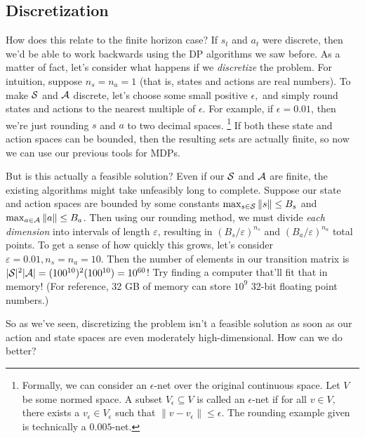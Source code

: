 \documentclass[../main/main]{subfiles}
\begin{document}

\subsection{Discretization}

How does this relate to the finite horizon case?
If $s_t$ and $a_t$ were discrete, then we'd be able to work backwards using
the DP algorithms we saw before.
As a matter of fact, let's consider what happens if we \emph{discretize} the
problem. For intuition, suppose $n_s = n_a = 1$ (that is, states and actions are real numbers).
To make $\S$ and $\A$ discrete, let's choose some small positive $\epsilon,$
and simply round states and actions to the nearest multiple of
$\epsilon.$ For example, if $\epsilon = 0.01$, then we're just rounding $s$ and $a$ to two decimal spaces. \footnote{Formally, we can consider an $\epsilon$-net over the original continuous space. Let $V$ be some normed space. A subset $V_\epsilon \subseteq V$ is called an $\epsilon$-net if for all $v \in V,$ there exists a $v_\epsilon \in V_\epsilon$ such that $\|v - v_\epsilon\| \le \epsilon.$ The rounding example given is technically a $0.005$-net.} If both these state and action spaces can be bounded, then the resulting sets are actually finite, so now we can use our previous tools for MDPs.

But is this actually a feasible solution? Even if our $\S$ and $\A$ are
finite, the existing algorithms might take unfeasibly long to complete.
Suppose our state and action spaces
are bounded by some constants $\max_{s \in \S} \|s\| \le B_s$ and
$\max_{a \in \A} \|a\| \le B_a$.
Then using our rounding method, we must divide \emph{each dimension} into intervals of length $\varepsilon$,
resulting in $(B_s/\varepsilon)^{n_s}$ and $(B_a/\varepsilon)^{n_a}$ total points.
To get a sense of how quickly this grows, let's consider $\varepsilon = 0.01, n_s = n_a = 10$. Then the number of elements in our transition matrix is $|\S|^2 |\A| = (100^{10})^2 (100^{10}) = 10^{60}$!
Try finding a computer that'll fit that in memory! (For reference, 32 GB of memory can store $10^9$ 32-bit floating point numbers.)

So as we've seen, discretizing the problem isn't a feasible solution as soon as
our action and state spaces are even moderately high-dimensional.
How can we do better?
\end{document}
